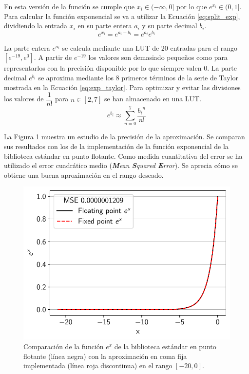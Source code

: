 En esta versión de la función se cumple que $x_i \in (-\infty, 0]$ por lo que $e^{x_i} \in (0,1]$. Para calcular la función exponencial se va a utilizar la Ecuación \ref{eq:split_exp}, dividiendo la entrada $x_i$ en su parte entera $a_i$ y su parte decimal $b_i$.
\begin{equation} \label{eq:split_exp}
e^{x_i} = e^{a_i+b_i} = e^{a_i} e^{b_i}
\end{equation}

La parte entera $e^{a_i}$ se calcula mediante una LUT de 20 entradas para el rango $[e^{-19}, e^{0}]$. A partir de $e^{-19}$ los valores son demasiado pequeños como para representarlos con la precisión disponible por lo que siempre valen $0$. La parte decimal $e^{b_i}$ se aproxima mediante los 8 primeros términos de la serie de Taylor mostrada en la Ecuación \ref{eq:exp_taylor}. Para optimizar y evitar las divisiones los valores de $\dfrac{1}{n!}$ para $n \in [2,7]$ se han almacenado en una LUT.
\begin{equation} \label{eq:exp_taylor}
e^{b_i} \approx \sum_{n=0}^{7} \dfrac{{b_i}^n}{n!}
\end{equation}

La Figura \ref{fig:exp_aprox} muestra un estudio de la precisión de la aproximación. Se comparan sus resultados con los de la implementación de la función exponencial de la biblioteca estándar en punto flotante. Como medida cuantitativa del error se ha utilizado el error cuadrático medio (\textit{\textbf{M}ean \textbf{S}quared \textbf{E}rror}). Se aprecia cómo se obtiene una buena aproximación en el rango deseado.

\begin{figure}[h]
	\centering
	\includegraphics[width=0.55\linewidth]{root/Imagenes/bnn_lib/exp_aprox.pdf}
	\caption{Comparación de la función $e^x$ de la biblioteca estándar en punto flotante (línea negra) con la aproximación en coma fija implementada (línea roja discontinua) en el rango $[-20,0]$.}
	\label{fig:exp_aprox}
\end{figure}

